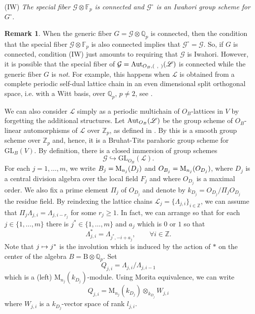 \documentclass[reqno, 10pt]{amsart}
\makeatletter
\newcommand{\BF}{\ensuremath{\mathbb {F}}\xspace}
\newcommand{\BQ}{\ensuremath{\mathbb {Q}}\xspace}
\newcommand{\BZ}{\ensuremath{\mathbb {Z}}\xspace}
\newcommand{\CG}{\ensuremath{\mathcal {G}}\xspace}
\newcommand{\RB}{\ensuremath{\mathrm {B}}\xspace}
\newcommand{\RM}{\ensuremath{\mathrm {M}}\xspace}
\newcommand{\GL}{\mathrm{GL}}
\theoremstyle{definition}
\newtheorem{remark}[subsubsection]{Remark}
\numberwithin{equation}{subsection}
\numberwithin{subsubsection}{subsection}
\let\shortmapsto\mapsto
\renewcommand{\mapsto}{%
   \ifbool{@display}{\shortmapsto}{\shortmapsto}%
   }
\makeatother
\begin{document}
(IW) \emph{The special fiber $\CG\otimes \BF_p$ is connected and $\CG^\circ$ is 
an Iwahori group scheme for $G^\circ$.} 
\smallskip
\begin{remark}
When the generic fiber $G=\CG\otimes \BQ_p$ is connected, then the condition that the special fiber $\CG\otimes \BF_p$ is also connected implies that
$\CG^\circ=\CG$. So, if $G$ is connected, condition (IW) just amounts to requiring that $\CG$ is Iwahori.
However,  it is possible 
 that the special fiber of $\CG={\rm Aut}_{O_B, (\ ,\ )}(\mathscr L)$ is connected while the generic fiber $G$ is \emph{not}. For example, this happens when $\mathscr L$ is obtained from a complete periodic self-dual lattice chain in an  even dimensional split orthogonal space, i.e. with a Witt basis, over $\BQ_p$, $p\neq 2$, see \cite[Lem. 4.3.2]{Smithling}.
\end{remark}

We can also consider $\mathscr L$ simply as a periodic multichain of $O_B$-lattices in $V$ by forgetting the additional structures. Let ${\rm Aut}_{O_B}({\mathscr L})$ be the  group scheme of $O_B$-linear automorphisms of $\mathscr L$ over $\BZ_p$, as defined in \cite[Ch. 3]{RZbook}. 
By \cite[Thm. 3.11]{RZbook} this is a smooth group scheme over $\BZ_p$ and, hence, it is a 
Bruhat-Tits parahoric group scheme for $\GL_B(V)$. By definition, there is a closed immersion of group schemes
\begin{equation}\label{groupClosedImm}
\CG\hookrightarrow \GL_{O_B}(\mathscr L).
\end{equation}
 For each $j=1,\ldots,m$, we write $B_j={\rm M}_{n_j}(D_j)$ and  $O_{B_j}={\rm M}_{n_j}(O_{D_j})$, where $D_j$ is a central division algebra over the local field $F_j$ and where $O_{D_j}$ is a maximal order. We also fix a prime element $\Pi_j$ of $O_{D_j}$ and denote by $k_{D_j}=O_{D_j}/\Pi_jO_{D_j}$ the residue field. By reindexing the lattice chains $\mathscr L_j=\{\Lambda_{j, i}\}_{i\in \BZ}$, we can assume that  
$\Pi_j\Lambda_{j,i}=\Lambda_{j, i-r_j}$ for some $r_j\geq 1$. In fact, we can arrange so that for each $j\in \{1,\ldots, m\}$ there is $j^*\in\{1,\ldots, m\}$
and $a_j$ which is $0$ or $1$ so that
\begin{equation}
\Lambda_{j, i}^*=\Lambda_{j^*, -i+a_j},\qquad \forall i\in \BZ.
\end{equation}
Note that $j\mapsto j^*$ is the involution which is induced by the action of $*$ on the center of the algebra $B=\RB\otimes\BQ_p$. 
Set
\[
Q_{j, i}=\Lambda_{j,i}/\Lambda_{j, i-1}
\]
which is a (left) $\RM_{n_j}(k_{D_j})$-module. Using Morita equivalence, we can write 
\[
Q_{j, i}=\RM_{n_j}(k_{D_j})\otimes_{k_{D_j}}W_{j,i}
\]
where $W_{j,i}$ is a $k_{D_j}$-vector space of rank $l_{j,i}$.
\end{document}
